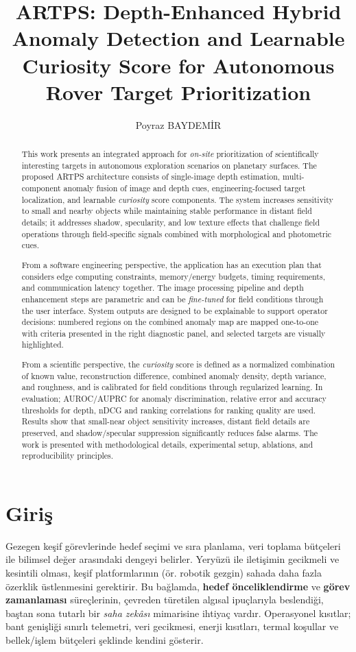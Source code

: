 \documentclass[12pt]{article}
\title{ARTPS: Depth-Enhanced Hybrid Anomaly Detection and Learnable Curiosity Score for Autonomous Rover Target Prioritization}
\author{Poyraz BAYDEMİR}
\date{}
\begin{document}
\maketitle

\tableofcontents
\newpage

\begin{abstract}
This work presents an integrated approach for \emph{on-site} prioritization of scientifically interesting targets in autonomous exploration scenarios on planetary surfaces. The proposed ARTPS architecture consists of single-image depth estimation, multi-component anomaly fusion of image and depth cues, engineering-focused target localization, and learnable \emph{curiosity} score components. The system increases sensitivity to small and nearby objects while maintaining stable performance in distant field details; it addresses shadow, specularity, and low texture effects that challenge field operations through field-specific signals combined with morphological and photometric cues.

From a software engineering perspective, the application has an execution plan that considers edge computing constraints, memory/energy budgets, timing requirements, and communication latency together. The image processing pipeline and depth enhancement steps are parametric and can be \emph{fine-tuned} for field conditions through the user interface. System outputs are designed to be explainable to support operator decisions: numbered regions on the combined anomaly map are mapped one-to-one with criteria presented in the right diagnostic panel, and selected targets are visually highlighted.

From a scientific perspective, the \emph{curiosity} score is defined as a normalized combination of known value, reconstruction difference, combined anomaly density, depth variance, and roughness, and is calibrated for field conditions through regularized learning. In evaluation; AUROC/AUPRC for anomaly discrimination, relative error and accuracy thresholds for depth, nDCG and ranking correlations for ranking quality are used. Results show that small-near object sensitivity increases, distant field details are preserved, and shadow/specular suppression significantly reduces false alarms. The work is presented with methodological details, experimental setup, ablations, and reproducibility principles.
\end{abstract}

\section{Giriş}
Gezegen keşif görevlerinde hedef seçimi ve sıra planlama, veri toplama bütçeleri ile bilimsel değer arasındaki dengeyi belirler. Yeryüzü ile iletişimin gecikmeli ve kesintili olması, keşif platformlarının (ör. robotik gezgin) sahada daha fazla özerklik üstlenmesini gerektirir. Bu bağlamda, \textbf{hedef önceliklendirme} ve \textbf{görev zamanlaması} süreçlerinin, çevreden türetilen algısal ipuçlarıyla beslendiği, baştan sona tutarlı bir \emph{saha zekâsı} mimarisine ihtiyaç vardır. Operasyonel kısıtlar; bant genişliği sınırlı telemetri, veri gecikmesi, enerji kısıtları, termal koşullar ve bellek/işlem bütçeleri şeklinde kendini gösterir.
\end{document}
